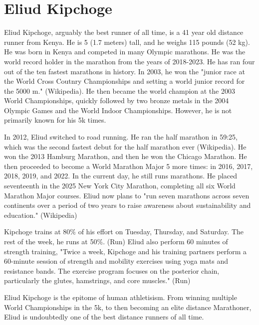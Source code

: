 \documentclass[letterpaper]{article}
\newcommand{\titleDOC}{}
\newcommand{\authorDOC}{Daniel Sabalakov}
\newcommand{\classDOC}{}
\newcommand{\quoteDOC}{``\textit{Truth is ever to be found in the simplicity, and not in the multiplicity and confusion of things}'' - Issac Newton}
\begin{document}








\renewcommand{\titleDOC}{3.2 Eliud Kipchoge}

\renewcommand{\quoteDOC}{``\textit{May the Force Be With You}'' \textemdash{} General Jan Dodonna}

\renewcommand{\classDOC}{PE Running}

\renewcommand{\authorDOC}{Daniel Sabalakov}



\section{Eliud Kipchoge}\label{eliud-kipchoge}

 \begin{doublespace} 

Eliud Kipchoge, arguably the best runner of all time, is a 41 year old distance runner from Kenya. He is 5 (1.7 meters) tall, and he weighs 115 pounds (52 kg). He was born in Kenya and competed in many Olympic marathons. He was the world record holder in the marathon from the years of 2018-2023. He has ran four out of the ten fastest marathons in history. In 2003, he won the "junior race at the World Cross Coutnry Championships and setting a world junior record for the 5000 m." (Wikipedia). He then became the world champion at the 2003 World Championships, quickly followed by two bronze metals in the 2004 Olympic Games and the World Indoor Championships. However, he is not primarily known for his 5k times.

In 2012, Eliud switched to road running. He ran the half marathon in 59:25, which was the second fastest debut for the half marathon ever (Wikipedia). He won the 2013 Hamburg Marathon, and then he won the Chicago Marathon. He then proceeded to become a World Marathon Major 5 more times: in 2016, 2017, 2018, 2019, and 2022. In the current day, he still runs marathons. He placed seventeenth in the 2025 New York City Marathon, completing all six World Marathon Major courses. Eliud now plans to "run seven marathons across seven continents over a period of two years to raise awareness about sustainability and education." (Wikipedia)

Kipchoge trains at 80\% of his effort on Tuesday, Thursday, and Saturday. The rest of the week, he runs at 50\%. (Run) Eliud also perform 60 minutes of strength training, "Twice a week, Kipchoge and his training partners perform a 60-minute session of strength and mobility exercises using yoga mats and resistance bands. The exercise program focuses on the posterior chain, particularly the glutes, hamstrings, and core muscles." (Run)

Eliud Kipchoge is the epitome of human athletisism. From winning multiple World Championships in the 5k, to then becoming an elite distance Marathoner, Eliud is undoubtedly one of the best distance runners of all time.

 \end{doublespace} 
\end{document}
